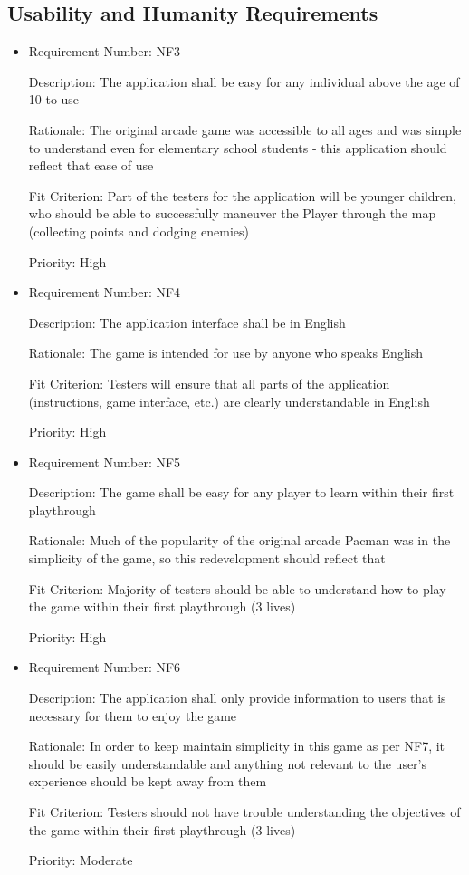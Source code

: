 \documentclass[12pt, titlepage]{article}
\begin{document}
\subsection{Usability and Humanity Requirements}
\begin{itemize}
	\item
	Requirement Number: NF3

	Description: The application shall be easy for any individual above the age of 10 to use

	Rationale: The original arcade game was accessible to all ages and was simple to understand even for elementary school students - this application should reflect that ease of use

	Fit Criterion: Part of the testers for the application will be younger children, who should be able to successfully maneuver the Player through the map (collecting points and dodging enemies)

	Priority: High

	\item
	Requirement Number: NF4

	Description: The application interface shall be in English

	Rationale: The game is intended for use by anyone who speaks English

	Fit Criterion: Testers will ensure that all parts of the application (instructions, game interface, etc.) are clearly understandable in English

	Priority: High

	\item
	Requirement Number: NF5

	Description: The game shall be easy for any player to learn within their first playthrough

	Rationale: Much of the popularity of the original arcade Pacman was in the simplicity of the game, so this redevelopment should reflect that

	Fit Criterion: Majority of testers should be able to understand how to play the game within their first playthrough (3 lives)

	Priority: High

	\item
	Requirement Number: NF6

	Description: The application shall only provide information to users that is necessary for them to enjoy the game

	Rationale: In order to keep maintain simplicity in this game as per NF7, it should be easily understandable and anything not relevant to the user's experience should be kept away from them

	Fit Criterion: Testers should not have trouble understanding the objectives of the game within their first playthrough (3 lives)

	Priority: Moderate
\end{itemize}
\end{document}
